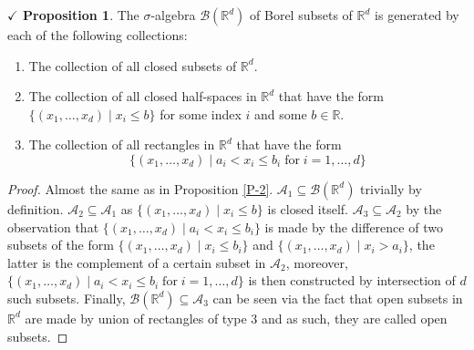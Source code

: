 \documentclass{article}
\theoremstyle{definition}
\theoremstyle{remark}
\theoremstyle{definition}
\theoremstyle{definition}
\newtheorem{proposition}{$\checkmark$ Proposition}
\theoremstyle{definition}
\newcommand{\where}{\;\vert\;}
\newcommand{\R}{\mathbb{R}}
\newcommand{\alg}[1]{\mathscr{#1}}
\newcommand{\bor}[1]{\mathscr{B}(#1)}
\begin{document}
\hrulefill
\begin{proposition}
	\label{P-3}
	The $ \sigma $-algebra $ \bor{\R^d} $ of Borel subsets of $ \R^d $ is generated by each of the following collections:
	\begin{enumerate}
		\item{The collection of all closed subsets of $ \R^d $.}
		\item {The collection of all closed half-spaces in $ \R^d $ that have the form $ \{(x_1,\dots,x_d)\where x_i\le b\} $ for some index $ i $ and some $ b\in \R $.}
		\item {The collection of all rectangles in $ \R^d $ that have the form 
	\[\{(x_1,\dots,x_d)\where a_i< x_i\le b_i\;\text{for}\;i=1,\dots,d\}\]	
	}
	\end{enumerate}
\end{proposition}
\begin{proof}
	Almost the same as in Proposition \ref{P-2}. $\alg{A}_1 \subseteq \bor{\R^d}$ trivially by definition. $ \alg{A}_2 \subseteq \alg{A}_1 $ as $ \{(x_1,\dots,x_d)\where x_i\le b\} $ is closed itself. $ \alg{A}_3\subseteq \alg{A}_2 $ by the observation that $ \{(x_1,\dots,x_d)\where a_i< x_i\le b_i\} $ is made by the difference of two subsets of the form $ \{(x_1,\dots,x_d)\where x_i\le b_i\} $ and $ \{(x_1,\dots,x_d)\where x_i> a_i\} $, the latter is the complement of a certain subset in $ \alg{A}_2 $, moreover, $ \{(x_1,\dots,x_d)\where a_i< x_i\le b_i\;\text{for}\;i=1,\dots,d\} $ is then constructed by intersection of $ d $ such subsets. Finally, $ \bor{\R^d} \subseteq \alg{A}_3$ can be seen via the fact that open subsets in $ \R^d $ are made by union of rectangles of type 3 and as such, they are called open subsets. 
\end{proof}
\hrulefill
\end{document}
